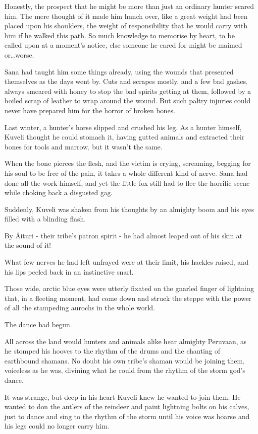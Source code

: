 Honestly, the prospect that he might be more than just an ordinary hunter scared him. The mere thought of it made him hunch over, like a great weight had been placed upon his shoulders, the weight of responsibility that he would carry with him if he walked this path. So much knowledge to memorise by heart, to be called upon at a moment's notice, else someone he cared for might be maimed or\ldots{}worse.

Sana had taught him some things already, using the wounds that presented themselves as the days went by. Cuts and scrapes mostly, and a few bad gashes, always smeared with honey to stop the bad spirits getting at them, followed by a boiled scrap of leather to wrap around the wound. But such paltry injuries could never have prepared him for the horror of broken bones.

Last winter, a hunter's horse slipped and crushed his leg. As a hunter himself, Kuveli thought he could stomach it, having gutted animals and extracted their bones for tools and marrow, but it wasn't the same.

When the bone pierces the flesh, and the victim is crying, screaming, begging for his soul to be free of the pain, it takes a whole different kind of nerve. Sana had done all the work himself, and yet the little fox still had to flee the horrific scene while choking back a disgusted gag.

Suddenly, Kuveli was shaken from his thoughts by an almighty boom and his eyes filled with a blinding flash.

By Äituri - their tribe's patron spirit - he had almost leaped out of his skin at the sound of it!

What few nerves he had left unfrayed were at their limit, his hackles raised, and his lips peeled back in an instinctive snarl.

Those wide, arctic blue eyes were utterly fixated on the gnarled finger of lightning that, in a fleeting moment, had come down and struck the steppe with the power of all the stampeding aurochs in the whole world.

The dance had begun.

All across the land would hunters and animals alike hear almighty Peruvaan, as he stomped his hooves to the rhythm of the drums and the chanting of earthbound shamans. No doubt his own tribe's shaman would be joining them, voiceless as he was, divining what he could from the rhythm of the storm god's dance.

It was strange, but deep in his heart Kuveli knew he wanted to join them. He wanted to don the antlers of the reindeer and paint lightning bolts on his calves, just to dance and sing to the rhythm of the storm until his voice was hoarse and his legs could no longer carry him.

